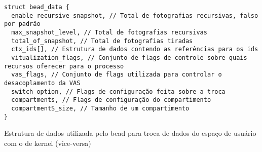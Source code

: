 \begin{pseudocode}

\begin{lstlisting}[language=pseudocode, style=pseudocode]
struct bead_data {
  enable_recursive_snapshot, // Total de fotografias recursivas, falso por padrão
  max_snapshot_level, // Total de fotografias recursivas
  total_of_snapshot, // Total de fotografias tiradas
  ctx_ids[], // Estrutura de dados contendo as referências para os ids
  vitualization_flags, // Conjunto de flags de controle sobre quais recursos oferecer para o processo
  vas_flags, // Conjunto de flags utilizada para controlar o desacoplamento da VAS
  switch_option, // Flags de configuração feita sobre a troca
  compartments, // Flags de configuração do compartimento
  compartmentS_size, // Tamanho de um compartimento
}

\end{lstlisting}

  \caption{Estrutura de dados utilizada pelo bead para troca de dados do espaço de usuário com o de kernel (vice-versa)}
  \label{alg:beadata}
\end{pseudocode}
